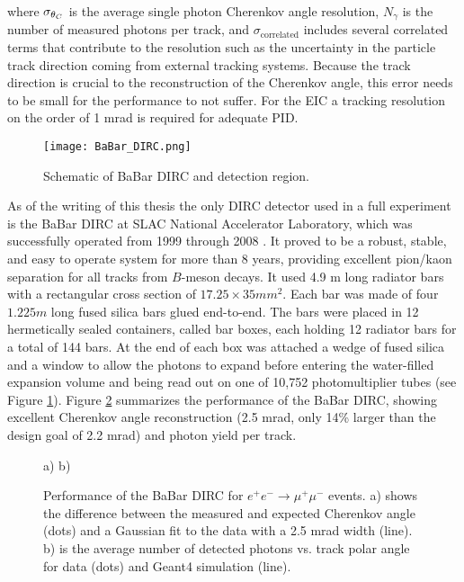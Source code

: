 where $\sigma_{\theta_{C}}$ is the average single photon Cherenkov angle resolution, $N_{\gamma}$ is the number of measured photons per track, and $\sigma_{\text{correlated}}$ includes several correlated terms that contribute to the resolution such as the uncertainty in the particle track direction coming from external tracking systems. Because the track direction is crucial to the reconstruction of the Cherenkov angle, this error needs to be small for the performance to not suffer. For the EIC a tracking resolution on the order of 1 mrad is required for adequate PID.

\begin{figure}[!htb]
	\centering
	\texttt{[image: BaBar\_DIRC.png]}
	\caption{Schematic of BaBar DIRC and detection region.}
	\label{fig:babardirc}
\end{figure}

As of the writing of this thesis the only DIRC detector used in a full experiment is the BaBar DIRC at SLAC National Accelerator Laboratory, which was successfully operated from 1999 through 2008 \cite{BaBarDIRC}. It proved to be a robust, stable, and easy to operate system for more than 8 years, providing excellent pion/kaon separation for all tracks from $B$-meson decays. It used 4.9 m long radiator bars with a rectangular cross section of $17.25 \times 35 \unit{mm}^2$. Each bar was made of four $1.225\unit{m}$ long fused silica bars glued end-to-end. The bars were placed in 12 hermetically sealed containers, called bar boxes, each holding 12 radiator bars for a total of 144 bars. At the end of each box was attached a wedge of fused silica and a window to allow the photons to expand before entering the water-filled expansion volume and being read out on one of 10,752 photomultiplier tubes (see Figure \ref{fig:babardirc}). Figure \ref{fig:babarperformance} summarizes the performance of the BaBar DIRC, showing excellent Cherenkov angle reconstruction (2.5 mrad, only 14\% larger than the design goal of 2.2 mrad) and photon yield per track.

\begin{figure}[!htb]
	\centering
	a)%
	b)%
	\caption{Performance of the BaBar DIRC for $e^{+}e^{-} \rightarrow \mu^{+}\mu^{-}$ events. a) shows the difference between the measured and expected Cherenkov angle (dots) and a Gaussian fit to the data with a 2.5 mrad width (line). b) is the average number of detected photons vs. track polar angle for data (dots) and Geant4 \cite{Geant4} simulation (line).}
	\label{fig:babarperformance}
\end{figure}

